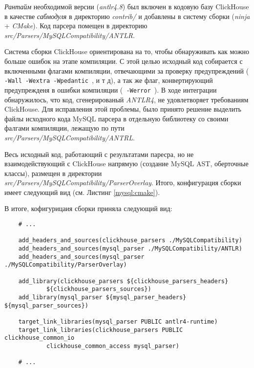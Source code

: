 \textit{Рантайм} необходимой версии (\textit{antlr4.8}) был включен в кодовую базу ClickHouse в качестве \textit{сабмодуля} в директорию \textit{contrib/} и добавлены в систему сборки (\textit{ninja} + \textit{CMake}). Код парсера помещен в директорию\\ \textit{src/Parsers/MySQLCompatibility/ANTLR}.

Система сборки ClickHouse ориентирована на то, чтобы обнаруживать как можно больше ошибок на этапе компиляции. С этой целью исходный код собирается с включенными флагами компиляции, отвечающими за проверку предупреждений (\texttt{ -Wall -Wextra -Wpedantic }, и т д), а так же флаг, конвертирующий предупрежденя в ошибки компиляции (\texttt{ -Werror }). В ходе интеграции обнаружилось, что код, сгенерированый \textit{ANTLR4}, не удовлетворяет требованиям ClickHouse. Для исправления этой проблемы, было принято решение выделить файлы исходного кода MySQL парсера в отдельную библиотеку со своими фалгами компиляции, лежащую по пути \textit{src/Parsers/MySQLCompatibility/ANTRL}. 

Весь исходный код, работающий с результатами паресра, но не взаимодействующий с ClickHouse напрямую (создание MySQL AST, оберточные классы), размещен в директории \textit{src/Parsers/MySQLCompatibility/ParserOverlay}. Итого, конфигурация сборки имеет следующий вид (см. Листинг \ref{mysql:cmake}).

В итоге, кофигурицаия сборки приняла следующий вид:
\begin{code}
    \label{mysql:cmake}
    \begin{verbatim}
    # ...

    add_headers_and_sources(clickhouse_parsers ./MySQLCompatibility)
    add_headers_and_sources(mysql_parser ./MySQLCompatibility/ANTLR)
    add_headers_and_sources(mysql_parser ./MySQLCompatibility/ParserOverlay)

    add_library(clickhouse_parsers ${clickhouse_parsers_headers}
            ${clickhouse_parsers_sources})
    add_library(mysql_parser ${mysql_parser_headers} ${mysql_parser_sources})

    target_link_libraries(mysql_parser PUBLIC antlr4-runtime)
    target_link_libraries(clickhouse_parsers PUBLIC clickhouse_common_io
            clickhouse_common_access mysql_parser)

    # ...
    \end{verbatim}
\end{code}

